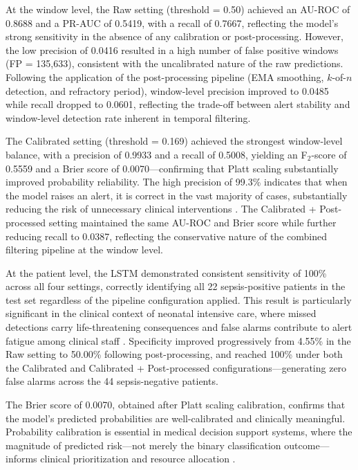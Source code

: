 \documentclass[conference]{IEEEtran}
\begin{document}
At the window level, the Raw setting (threshold = 0.50) 
achieved an AU-ROC of 0.8688 and a PR-AUC of 0.5419, 
with a recall of 0.7667, reflecting the model's strong 
sensitivity in the absence of any calibration or 
post-processing. However, the low precision of 0.0416 
resulted in a high number of false positive windows 
(FP = 135,633), consistent with the uncalibrated nature 
of the raw predictions. Following the application of 
the post-processing pipeline (EMA smoothing, $k$-of-$n$ 
detection, and refractory period), window-level precision 
improved to 0.0485 while recall dropped to 0.0601, 
reflecting the trade-off between alert stability and 
window-level detection rate inherent in temporal filtering.

The Calibrated setting (threshold = 0.169) achieved the 
strongest window-level balance, with a precision of 0.9933 
and a recall of 0.5008, yielding an F$_2$-score of 0.5559 
and a Brier score of 0.0070—confirming that Platt scaling 
substantially improved probability reliability. The high 
precision of 99.3\% indicates that when the model raises 
an alert, it is correct in the vast majority of cases, 
substantially reducing the risk of unnecessary clinical 
interventions \cite{Raghu2019ClinicalAI}. The Calibrated 
+ Post-processed setting maintained the same AU-ROC and 
Brier score while further reducing recall to 0.0387, 
reflecting the conservative nature of the combined 
filtering pipeline at the window level.

At the patient level, the LSTM demonstrated consistent 
sensitivity of 100\% across all four settings, correctly 
identifying all 22 sepsis-positive patients in the test 
set regardless of the pipeline configuration applied. 
This result is particularly significant in the clinical 
context of neonatal intensive care, where missed detections 
carry life-threatening consequences and false alarms 
contribute to alert fatigue among clinical staff 
\cite{Raghu2019ClinicalAI}. Specificity improved 
progressively from 4.55\% in the Raw setting to 50.00\% 
following post-processing, and reached 100\% under both 
the Calibrated and Calibrated + Post-processed 
configurations—generating zero false alarms across the 
44 sepsis-negative patients.

The Brier score of 0.0070, obtained after Platt scaling 
calibration, confirms that the model's predicted 
probabilities are well-calibrated and clinically 
meaningful. Probability calibration is essential in 
medical decision support systems, where the magnitude 
of predicted risk—not merely the binary classification 
outcome—informs clinical prioritization and resource 
allocation \cite{Nemati2018Interpretable,Saria2019SafeML}.
\end{document}
